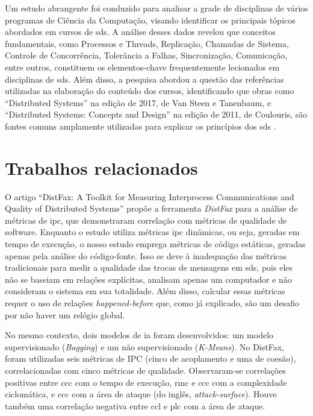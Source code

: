 Um estudo abrangente foi conduzido para analisar a grade de disciplinas de vários programas de Ciência da Computação, visando identificar os principais tópicos abordados em cursos de \gls{sds}. A análise desses dados revelou que conceitos fundamentais, como Processos e Threads, Replicação, Chamadas de Sistema, Controle de Concorrência, Tolerância a Falhas, Sincronização, Comunicação, entre outros, constituem os elementos-chave frequentemente lecionados em disciplinas de \gls{sds}. Além disso, a pesquisa abordou a questão das referências utilizadas na elaboração do conteúdo dos cursos, identificando que obras como ``Distributed Systems'' na edição de 2017, de Van Steen e Tanenbaum, e ``Distributed Systems: Concepts and Design'' na edição de 2011, de Coulouris, são fontes comuns amplamente utilizadas para explicar os princípios dos \gls{sds} \cite{HaveWeReachedConsensus}.

\section{Trabalhos relacionados}
\label{section:related-work}

O artigo ``DistFax: A Toolkit for Measuring Interprocess Communications and Quality of Distributed Systems'' \cite{DistFax} propõe a ferramenta \textit{DistFax} para a análise de métricas de \gls{ipc}, que demonstraram correlação com métricas de qualidade de software. Enquanto o estudo utiliza métricas \gls{ipc} dinâmicas, ou seja, geradas em tempo de execução, o nosso estudo emprega métricas de código estáticas, geradas apenas pela análise do código-fonte. Isso se deve à inadequação das métricas tradicionais para medir a qualidade das trocas de mensagens em \gls{sds}, pois eles não se baseiam em relações explícitas, analisam apenas um computador e não consideram o sistema em sua totalidade. Além disso, calcular essas métricas requer o uso de relações \textit{happened-before} que, como já explicado, são um desafio por não haver um relógio global.

No mesmo contexto, dois modelos de \gls{ia} foram desenvolvidos: um modelo supervisionado (\textit{Bagging}) e um não supervisionado (\textit{K-Means}). No DistFax, foram utilizadas seis métricas de IPC (cinco de acoplamento e uma de coesão), correlacionadas com cinco métricas de qualidade. Observaram-se correlações positivas entre \gls{ccc} com o tempo de execução, \gls{rmc} e \gls{ccc} com a complexidade ciclomática, e \gls{ccc} com a área de ataque (do inglês, \textit{attack-surface}). Houve também uma correlação negativa entre \gls{ccl} e \gls{plc} com a área de ataque.

